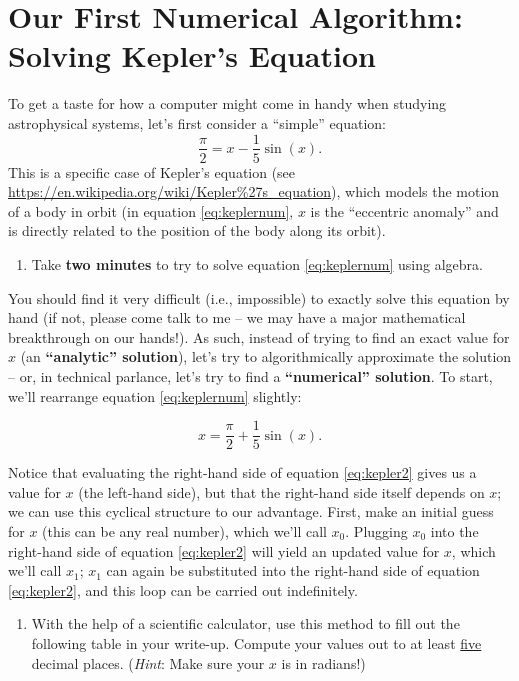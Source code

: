 \documentclass[11pt]{article}
\begin{document}
\section{Our First Numerical Algorithm: Solving Kepler's Equation}
To get a taste for how a computer might come in handy when studying astrophysical systems, let's first consider a ``simple'' equation:
\begin{equation} \label{eq:keplernum}
    \frac{\pi}{2} = x - \frac{1}{5} \sin(x).
\end{equation}
This is a specific case of Kepler's equation (see  \url{https://en.wikipedia.org/wiki/Kepler\%27s_equation}), which models the motion of a body in orbit (in equation \ref{eq:keplernum}, $x$ is the ``eccentric anomaly'' and is directly related to the position of the body along its orbit).

\begin{enumerate}[resume]
    \item Take \textbf{two minutes} to try to solve equation \ref{eq:keplernum} using algebra.
\end{enumerate}

\noindent
You should find it very difficult (i.e., impossible) to exactly solve this equation by hand (if not, please come talk to me -- we may have a major mathematical breakthrough on our hands!). As such, instead of trying to find an exact value for $x$ (an \textbf{``analytic'' solution}), let's try to algorithmically approximate the solution -- or, in technical parlance, let's try to find a \textbf{``numerical'' solution}. To start, we'll rearrange equation \ref{eq:keplernum} slightly:

\begin{equation} \label{eq:kepler2}
    x = \frac{\pi}{2} + \frac{1}{5}\sin(x).
\end{equation}

\noindent
Notice that evaluating the right-hand side of equation \ref{eq:kepler2} gives us a value for $x$ (the left-hand side), but that the right-hand side itself depends on $x$; we can use this cyclical structure to our advantage. First, make an initial guess for $x$ (this can be any real number), which we'll call $x_0$. Plugging $x_0$ into the right-hand side of equation \ref{eq:kepler2} will yield an updated value for $x$, which we'll call $x_1$; $x_1$ can again be substituted into the right-hand side of equation \ref{eq:kepler2}, and this loop can be carried out indefinitely.

\begin{enumerate}[resume]
    \item With the help of a scientific calculator, use this method to fill out the following table in your write-up. Compute your values out to at least \underline{five} decimal places. (\textit{Hint}: Make sure your $x$ is in radians!)
\end{enumerate}
\end{document}
